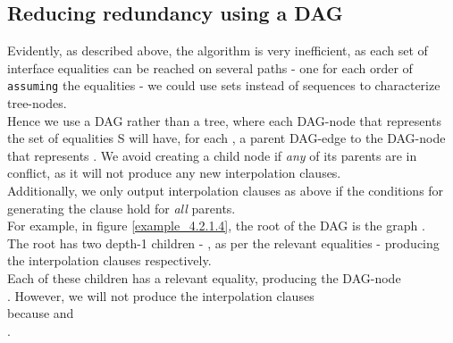 \subsection*{Reducing redundancy using a DAG}
Evidently, as described above, the algorithm is very inefficient, as each set of interface equalities can be reached on several paths - one for each order of \lstinline|assuming| the equalities - we could use sets instead of sequences to characterize tree-nodes.\\
Hence we use a DAG rather than a tree, where each DAG-node that represents the set of equalities S will have, for each , 
a parent DAG-edge to the DAG-node that represents .
We avoid creating a child node if \emph{any} of its parents are in conflict, as it will not produce any new interpolation clauses.\\
Additionally, we only output interpolation clauses as above if the conditions for generating the clause hold for \emph{all} parents.\\
For example, in figure \ref{example_4.2.1.4}, the root of the DAG is the graph .\\
The root has two depth-1 children - , as per the relevant equalities - producing the interpolation clauses 
 respectively.\\
Each of these children has a relevant equality, producing the DAG-node \\
.
However, we will not produce the interpolation clauses \\
 because
 and\\
 .

